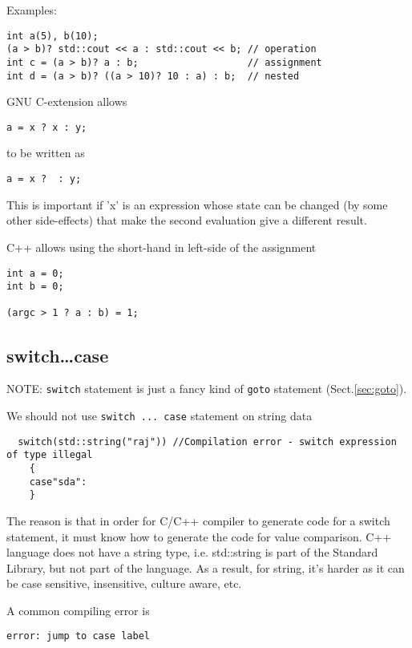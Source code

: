 Examples:
\begin{lstlisting}
int a(5), b(10);
(a > b)? std::cout << a : std::cout << b; // operation
int c = (a > b)? a : b;                   // assignment
int d = (a > b)? ((a > 10)? 10 : a) : b;  // nested
\end{lstlisting}

\begin{mdframed}
GNU C-extension allows
\begin{verbatim}
a = x ? x : y;
\end{verbatim}
to be written as
\begin{verbatim}
a = x ?  : y;
\end{verbatim}
This is important if 'x' is an expression whose state can be changed (by some
other side-effects) that make the second evaluation give a different result.
\end{mdframed}

C++ allows using the short-hand in left-side of the assignment
\begin{verbatim}
int a = 0;
int b = 0;

(argc > 1 ? a : b) = 1;
\end{verbatim}

\subsection{switch\ldots case}

NOTE: \verb!switch! statement is just a fancy kind of \verb!goto! statement (Sect.\ref{sec:goto}).  

We should not use \verb!switch ... case! statement on string data
\begin{verbatim}
  switch(std::string("raj")) //Compilation error - switch expression of type illegal 
    {
    case"sda":
    }
\end{verbatim}
The reason is that in order for C/C++ compiler to generate code for a switch
statement, it must know how to generate the code for value comparison. 
C++ language does not have a string type, i.e. std::string is part of the
Standard Library, but not part of the language. As a result, for string, it's
harder as it can be case sensitive, insensitive, culture aware, etc. 


A common compiling error is
\begin{verbatim}
error: jump to case label
\end{verbatim}

